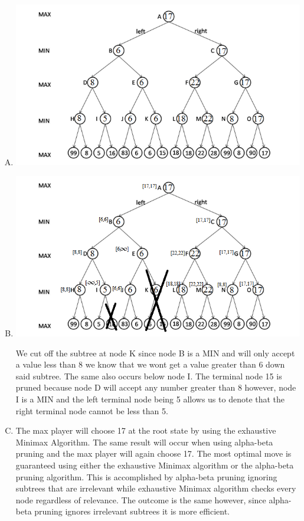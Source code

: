 \documentclass[10pt,a4paper]{article}
\begin{document}
	\begin{enumerate}[A.]
		\item
		\begin{center}
			\includegraphics[scale=0.5]{Minimax}
		\end{center}
		\item
		\begin{center}
			\includegraphics[scale=0.5]{Pruning}
		\end{center}
		
		We cut off the subtree at node K since node B is a MIN and will only accept a value less than 8 we know that we wont get a value greater than 6 down said subtree. The same also occurs below node I. The terminal node 15 is pruned because node D will accept any number greater than 8 however, node I is a MIN and the left terminal node being 5 allows us to denote that the right terminal node cannot be less than 5.
		
		\item 
		The max player will choose 17 at the root state by using the exhaustive Minimax Algorithm. The same result will occur when using alpha-beta pruning
		and the max player will again choose 17. The most optimal move is guaranteed using either the exhaustive Minimax algorithm or the alpha-beta pruning algorithm. This is accomplished by alpha-beta pruning ignoring subtrees that are irrelevant while exhaustive Minimax algorithm checks every node regardless of relevance. The outcome is the same however, since alpha-beta pruning ignores irrelevant subtrees it is more efficient.
		

\end{enumerate}
\end{document}
